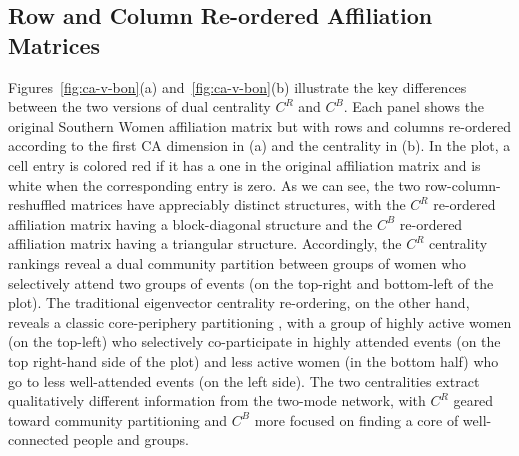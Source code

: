 \documentclass[a4paper,fleqn]{cas-sc}
\begin{document}
\subsection{Row and Column Re-ordered Affiliation Matrices}
Figures~\ref{fig:ca-v-bon}(a) and~\ref{fig:ca-v-bon}(b) illustrate the key differences between the two versions of dual centrality $C^R$ and $C^B$. Each panel shows the original Southern Women affiliation matrix but with rows and columns re-ordered according to the first CA dimension in (a) and the \citet{bonacich1991simultaneous} centrality in (b). In the plot, a cell entry is colored red if it has a one in the original affiliation matrix and is white when the corresponding entry is zero. As we can see, the two row-column-reshuffled matrices have appreciably distinct structures, with the $C^R$ re-ordered affiliation matrix having a block-diagonal structure and the $C^B$ re-ordered affiliation matrix having a triangular structure. Accordingly, the $C^R$ centrality rankings reveal a dual community partition between groups of women who selectively attend two groups of events (on the top-right and bottom-left of the plot). The traditional eigenvector centrality re-ordering, on the other hand, reveals a classic core-periphery partitioning \citep{borgatti2000models}, with a group of highly active women (on the top-left) who selectively co-participate in highly attended events (on the top right-hand side of the plot) and less active women (in the bottom half) who go to less well-attended events (on the left side). The two centralities extract qualitatively different information from the two-mode network, with $C^R$ geared toward community partitioning and $C^B$ more focused on finding a core of well-connected people and groups. 
\end{document}
